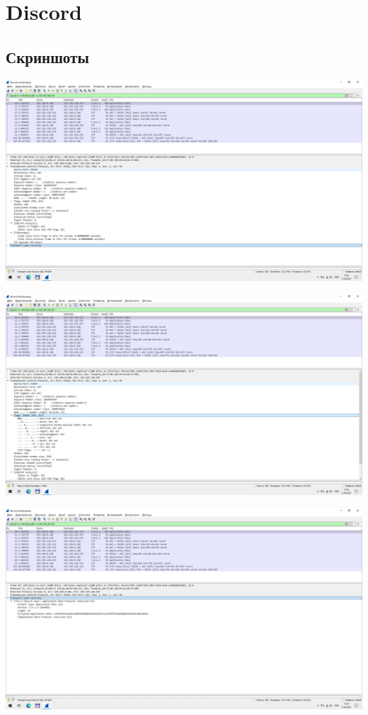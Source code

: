 
\section{Discord}

\subsection{Скриншоты}

\begin{center}

    \includegraphics[width=\textwidth]{screenshots/discord_send_1}

    \includegraphics[width=\textwidth]{screenshots/discord_send_2}

    \includegraphics[width=\textwidth]{screenshots/discord_send_3}


\end{center}
